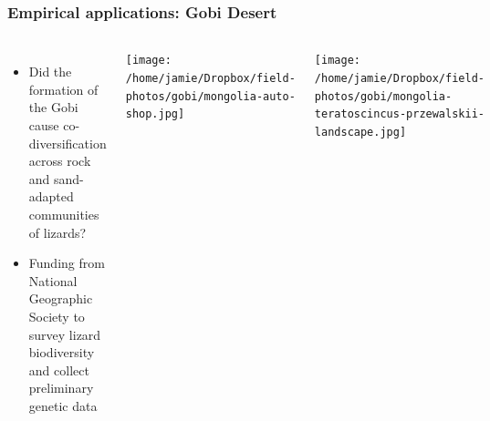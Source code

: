 \begin{frame}
    \frametitle{Empirical applications: Gobi Desert}
    \begin{columns}
        \begin{itemize}
            \item Did the formation of the Gobi cause co-diversification
                across rock and sand-adapted communities of lizards?
            \item<2-> Funding from National Geographic Society to
                survey lizard biodiversity and collect preliminary
                genetic data
        \end{itemize}

        {\centering
            \texttt{[image: /home/jamie/Dropbox/field-photos/gobi/mongolia-auto-shop.jpg]}

            \vspace{2mm}
            \texttt{[image: /home/jamie/Dropbox/field-photos/gobi/mongolia-teratoscincus-przewalskii-landscape.jpg]}
        }
    \end{columns}
\end{frame}


